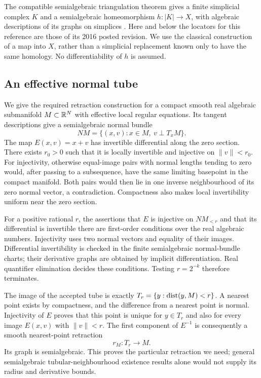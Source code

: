 The compatible semialgebraic triangulation theorem gives a finite
simplicial complex $K$ and a semialgebraic homeomorphism
$h:|K|\longrightarrow X$, with algebraic descriptions of its graphs
on simplices \cite[Theorem~5.43 and Remark~11.46(b)]{BPR}.
Here and below the locators for this reference are those of its
2016 posted revision. We use the classical construction of a
map into $X$, rather than a simplicial replacement known only
to have the same homology. No differentiability of $h$ is assumed.

\subsection{An effective normal tube}

We give the required retraction construction for a compact smooth
real algebraic submanifold $M\subset\mathbb R^N$ with effective local
regular equations. Its tangent descriptions give a semialgebraic
normal bundle
\[
 NM=\{(x,v):x\in M,\ v\perp T_xM\}.
\]
The map $E(x,v)=x+v$ has invertible differential along the zero
section. There exists $r_0>0$ such that it is locally invertible and
injective on $\|v\|<r_0$. For injectivity, otherwise equal-image
pairs with normal lengths tending to zero would, after passing to
a subsequence, have the same limiting basepoint in the compact
manifold. Both pairs would then lie in one inverse neighbourhood
of its zero normal vector, a contradiction. Compactness also makes
local invertibility uniform near the zero section.

For a positive rational $r$, the assertions that $E$ is injective
on $NM_{<r}$ and that its differential is invertible there are
first-order conditions over the real algebraic numbers. Injectivity
uses two normal vectors and equality of their images. Differential
invertibility is checked in the finite semialgebraic normal-bundle
charts; their derivative graphs are obtained by implicit
differentiation. Real quantifier elimination decides these conditions.
Testing $r=2^{-k}$ therefore terminates.

The image of the accepted tube is exactly
$T_r=\{y:\operatorname{dist}(y,M)<r\}$. A nearest point exists by compactness,
and the difference from a nearest point is normal. Injectivity of
$E$ proves that this point is unique for $y\in T_r$ and also
for every image $E(x,v)$ with $\|v\|<r$. The first component of
$E^{-1}$ is consequently a smooth nearest-point retraction
\begin{equation}\label{eq:normal-retraction}
                       r_M:T_r\longrightarrow M.
\end{equation}
Its graph is semialgebraic. This proves the particular retraction
we need; general semialgebraic tubular-neighbourhood existence
results alone would not supply its radius and derivative bounds.

